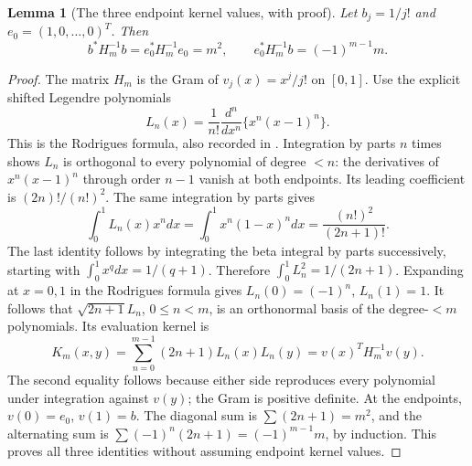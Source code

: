 \documentclass[11pt]{article}
\newtheorem{lemma}[theorem]{Lemma}
\begin{document}
\begin{lemma}[The three endpoint kernel values, with proof]\label{lem:Legendre}
Let $b_j=1/j!$ and $e_0=(1,0,\ldots,0)^T$. Then
\[
 b^*H_m^{-1}b=e_0^*H_m^{-1}e_0=m^2,\qquad
                  e_0^*H_m^{-1}b=(-1)^{m-1}m.
 \tag{EG48}\label{eq:Legendre-values}
\]
\end{lemma}
\begin{proof}
The matrix $H_m$ is the Gram of $v_j(x)=x^j/j!$ on $[0,1]$.
Use the explicit shifted Legendre polynomials
\[
 L_n(x)=\frac1{n!}\frac{d^n}{dx^n}\{x^n(x-1)^n\}.
\]
This is the Rodrigues formula, also recorded in
\cite[\S18.5(ii)]{DLMFLegendre}. Integration by parts $n$ times
shows $L_n$ is orthogonal to every polynomial of degree $<n$:
the derivatives of $x^n(x-1)^n$ through order $n-1$ vanish at both
endpoints. Its leading coefficient is $(2n)!/(n!)^2$.
The same integration by parts gives
\[
 \int_0^1 L_n(x)x^n dx=\int_0^1x^n(1-x)^n dx
                   =\frac{(n!)^2}{(2n+1)!}.
\]
The last identity follows by integrating the beta integral by parts
successively, starting with $\int_0^1x^qdx=1/(q+1)$.
Therefore $\int_0^1L_n^2=1/(2n+1)$. Expanding at $x=0,1$ in
the Rodrigues formula gives $L_n(0)=(-1)^n$, $L_n(1)=1$.
It follows that $\sqrt{2n+1}L_n$, $0\le n<m$, is an orthonormal
basis of the degree-$<m$ polynomials. Its evaluation kernel is
\[
 K_m(x,y)=\sum_{n=0}^{m-1}(2n+1)L_n(x)L_n(y)
                     =v(x)^T H_m^{-1}v(y).
\]
The second equality follows because either side reproduces every
polynomial under integration against $v(y)$; the Gram is positive
definite. At the endpoints, $v(0)=e_0$, $v(1)=b$. The diagonal sum
is $\sum(2n+1)=m^2$, and the alternating sum is
$\sum(-1)^n(2n+1)=(-1)^{m-1}m$, by induction. This proves all three
identities without assuming endpoint kernel values.
\end{proof}
\end{document}
